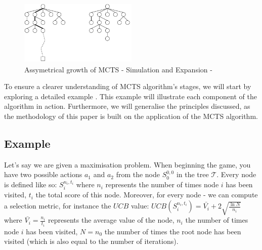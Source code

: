 \begin{figure}[!ht]
    \centering
    \includegraphics[width=0.5\textwidth]{Figures/assymetric_growth_mcts_tree.png}
    \caption{Assymetrical growth of MCTS - Simulation and Expansion - \cite{mcts_assymetrical_growth}}
    \label{fig:Assymetrical_growth_MCTS}
\end{figure}
\newpage
To ensure a clearer understanding of MCTS algorithm's stages, we will start by exploring a detailed example \cite{example_youtube_mcts}. This example will illustrate each component of the algorithm in action. Furthermore, we will generalise the principles discussed, as the methodology of this paper is built on the application of the MCTS algorithm.


\subsection{Example}
\label{subsub:Example}
Let's say we are given a maximisation problem. When beginning the game, you have two possible actions $a_1$ and $a_2$ from the node $S^{0,0}_0$ in the tree $\mathcal{T}$.
Every node is defined like so: $S^{n_i,t_i}_i$ where $n_i$ represents the number of times node $i$ has been visited, $t_i$ the total score of this node.
Moreover, for every node - we can compute a selection metric, for instance the $UCB$ value: $UCB(S^{n_i,t_i}_i)=\bar{V_i} + 2 \sqrt{\frac{\ln N}{n_i}}$ where $\bar{V_i}=\frac{n_i}{t_i}$ represents the average value of the node, $n_i$ the number of times node $i$ has been visited, $N=n_0$ the number of times the root node has been visited (which is also equal to the number of iterations).

